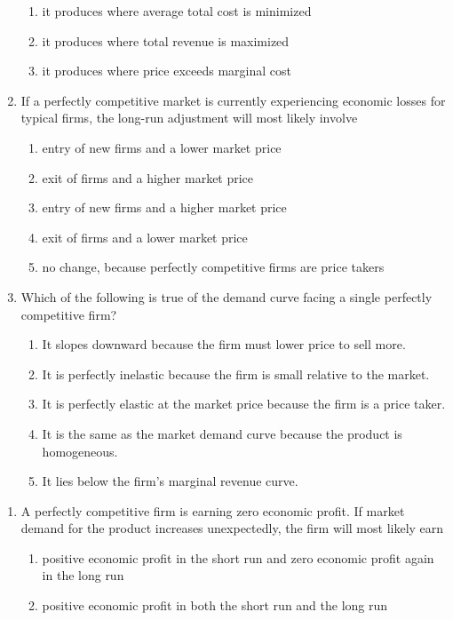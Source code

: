 \documentclass[10pt]{article}
\newenvironment{choiceslist}
  {\begin{enumerate}[label=(\Alph*), leftmargin=1.6em, itemsep=0.12em, topsep=0.18em, parsep=0pt]}
  {\end{enumerate}}
\begin{document}
\begin{multicols*}{2}
\begin{enumerate}[resume*=apq, leftmargin=*, itemsep=0.85em, topsep=0.2em, parsep=0pt]
\begin{choiceslist}
\item it produces where average total cost is minimized
\item it produces where total revenue is maximized
\item it produces where price exceeds marginal cost
\end{choiceslist}
\item If a perfectly competitive market is currently experiencing economic losses for typical firms, the long-run adjustment will most likely involve
\begin{choiceslist}
\item entry of new firms and a lower market price
\item exit of firms and a higher market price
\item entry of new firms and a higher market price
\item exit of firms and a lower market price
\item no change, because perfectly competitive firms are price takers
\end{choiceslist}
\item Which of the following is true of the demand curve facing a single perfectly competitive firm?
\begin{choiceslist}
\item It slopes downward because the firm must lower price to sell more.
\item It is perfectly inelastic because the firm is small relative to the market.
\item It is perfectly elastic at the market price because the firm is a price taker.
\item It is the same as the market demand curve because the product is homogeneous.
\item It lies below the firm's marginal revenue curve.
\end{choiceslist}
\end{enumerate}
\begin{enumerate}[resume*=apq, leftmargin=*, itemsep=0.85em, topsep=0.2em, parsep=0pt]
\item A perfectly competitive firm is earning zero economic profit. If market demand for the product increases unexpectedly, the firm will most likely earn
\begin{choiceslist}
\item positive economic profit in the short run and zero economic profit again in the long run
\item positive economic profit in both the short run and the long run

\end{choiceslist}
\end{enumerate}
\end{multicols*}
\end{document}
